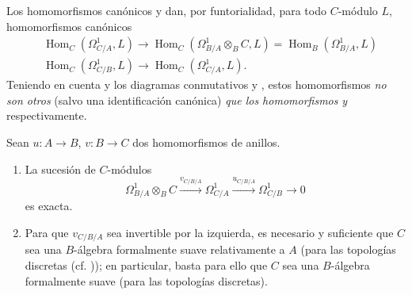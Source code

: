 \begin{env}[20.5.6]
\label{0.20.5.6-fr}
Los homomorfismos canónicos  y
 dan, por funtorialidad, para todo $C$-módulo $L$,
homomorfismos canónicos
\begin{align}
\tag{20.5.6.1}
\label{0.20.5.6.1-fr}
  &\operatorname{Hom}_C(\Omega^1_{C/A},L)
  \to\operatorname{Hom}_C(\Omega^1_{B/A}\otimes_B C,L)
  =\operatorname{Hom}_B(\Omega^1_{B/A},L) \\
\tag{20.5.6.2}
\label{0.20.5.6.2-fr}
  &\operatorname{Hom}_C(\Omega^1_{C/B},L)
  \to\operatorname{Hom}_C(\Omega^1_{C/A},L).
\end{align}
Teniendo en cuenta  y los diagramas conmutativos
 y , estos homomorfismos \emph{no son
otros} (salvo una identificación canónica) \emph{que los homomorfismos}
 \emph{y}  respectivamente.
\end{env}

\begin{theorem}[20.5.7]
\label{0.20.5.7-fr}
Sean $u:A\to B$, $v:B\to C$ dos homomorfismos de anillos.
\begin{enumerate}
  \item[\rm(i)] La sucesión de $C$-módulos
\begin{equation}
\tag{20.5.7.1}
\label{0.20.5.7.1-fr}
  \Omega^1_{B/A}\otimes_B C
  \xrightarrow{v_{C/B/A}}\Omega^1_{C/A}
  \xrightarrow{u_{C/B/A}}\Omega^1_{C/B}\to0
\end{equation}
es exacta.
  \item[\rm(ii)] Para que $v_{C/B/A}$ sea invertible por la izquierda, es
  necesario y suficiente que $C$ sea una $B$-álgebra formalmente suave relativamente a
  $A$ (para las topologías discretas \textup{(cf. )}); en
  particular, basta para ello que $C$ sea una $B$-álgebra formalmente
  suave (para las topologías discretas).
\end{enumerate}
\end{theorem}

